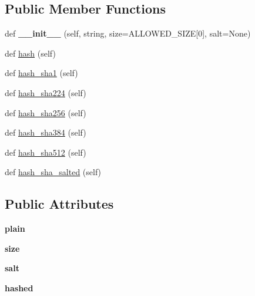 \subsection*{Public Member Functions}
\begin{DoxyCompactItemize}
\item 
def {\bfseries \+\_\+\+\_\+init\+\_\+\+\_\+} (self, string, size=A\+L\+L\+O\+W\+E\+D\+\_\+\+S\+I\+ZE\mbox{[}0\mbox{]}, salt=None)\hypertarget{classhal_1_1maths_1_1crypt_1_1_s_h_a_a32b2b45229d3680f460c18aec9dbf13f}{}\label{classhal_1_1maths_1_1crypt_1_1_s_h_a_a32b2b45229d3680f460c18aec9dbf13f}

\item 
def \hyperlink{classhal_1_1maths_1_1crypt_1_1_s_h_a_a4434870473a585d5382945a8cef6c7c3}{hash} (self)
\item 
def \hyperlink{classhal_1_1maths_1_1crypt_1_1_s_h_a_a87af3f937c0cfed513ea0720c4814246}{hash\+\_\+sha1} (self)
\item 
def \hyperlink{classhal_1_1maths_1_1crypt_1_1_s_h_a_ad258fade71cc488adc9e5cbcfaf7fc9c}{hash\+\_\+sha224} (self)
\item 
def \hyperlink{classhal_1_1maths_1_1crypt_1_1_s_h_a_aa2c42ae578cf76dc73cfd443fc931605}{hash\+\_\+sha256} (self)
\item 
def \hyperlink{classhal_1_1maths_1_1crypt_1_1_s_h_a_af0a05dbeeb0ec1f6530aa8c99937b44f}{hash\+\_\+sha384} (self)
\item 
def \hyperlink{classhal_1_1maths_1_1crypt_1_1_s_h_a_ad799ad40338287efb2a6f539954d35e9}{hash\+\_\+sha512} (self)
\item 
def \hyperlink{classhal_1_1maths_1_1crypt_1_1_s_h_a_a6dda220a8f58bb894cf01af53ce21b89}{hash\+\_\+sha\+\_\+salted} (self)
\end{DoxyCompactItemize}
\subsection*{Public Attributes}
\begin{DoxyCompactItemize}
\item 
{\bfseries plain}\hypertarget{classhal_1_1maths_1_1crypt_1_1_s_h_a_ad683af29f5abcb0607b3152750ed2848}{}\label{classhal_1_1maths_1_1crypt_1_1_s_h_a_ad683af29f5abcb0607b3152750ed2848}

\item 
{\bfseries size}\hypertarget{classhal_1_1maths_1_1crypt_1_1_s_h_a_a039dcc420e588091d5bf74037882ec31}{}\label{classhal_1_1maths_1_1crypt_1_1_s_h_a_a039dcc420e588091d5bf74037882ec31}

\item 
{\bfseries salt}\hypertarget{classhal_1_1maths_1_1crypt_1_1_s_h_a_ad0916d65406b116f81a23754a3ca3c79}{}\label{classhal_1_1maths_1_1crypt_1_1_s_h_a_ad0916d65406b116f81a23754a3ca3c79}

\item 
{\bfseries hashed}\hypertarget{classhal_1_1maths_1_1crypt_1_1_s_h_a_a633832075c61a928b02a9a9c0fa133eb}{}\label{classhal_1_1maths_1_1crypt_1_1_s_h_a_a633832075c61a928b02a9a9c0fa133eb}

\end{DoxyCompactItemize}
